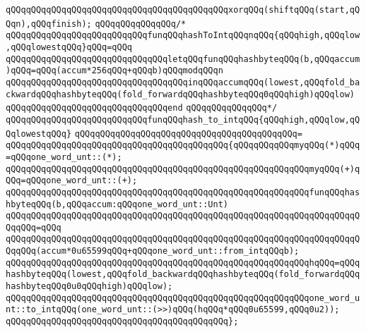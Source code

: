 \verb|qQQqqQQqqQQqqQQqqQQqqQQqqQQqqQQqqQQqqQQqqQQqxorqQQq(shiftqQQq(start,qQQqn),qQQqfinish);|\newline
\newline
\newline
\verb|qQQqqQQqqQQqqQQq/*|\newline
\verb|qQQqqQQqqQQqqQQqqQQqqQQqqQQqfunqQQqhashToIntqQQqnqQQq{qQQqhigh,qQQqlow,qQQqlowestqQQq}qQQq=qQQq|\newline
\verb|qQQqqQQqqQQqqQQqqQQqqQQqqQQqqQQqletqQQqfunqQQqhashbyteqQQq(b,qQQqaccum)qQQq=qQQq(accum*256qQQq+qQQqb)qQQqmodqQQqn|\newline
\verb|qQQqqQQqqQQqqQQqqQQqqQQqqQQqqQQqqQQqinqQQqaccumqQQq(lowest,qQQqfold_backwardqQQqhashbyteqQQq(fold_forwardqQQqhashbyteqQQq0qQQqhigh)qQQqlow)|\newline
\verb|qQQqqQQqqQQqqQQqqQQqqQQqqQQqqQQqend|\newline
\verb|qQQqqQQqqQQqqQQq*/|\newline
\verb|qQQqqQQqqQQqqQQqqQQqqQQqqQQqfunqQQqhash_to_intqQQq{qQQqhigh,qQQqlow,qQQqlowestqQQq}|\newline
\verb|qQQqqQQqqQQqqQQqqQQqqQQqqQQqqQQqqQQqqQQqqQQq=|\newline
\verb|qQQqqQQqqQQqqQQqqQQqqQQqqQQqqQQqqQQqqQQqqQQq{qQQqqQQqqQQqmyqQQq(*)qQQq=qQQqone_word_unt::(*);|\newline
\verb|qQQqqQQqqQQqqQQqqQQqqQQqqQQqqQQqqQQqqQQqqQQqqQQqqQQqqQQqqQQqmyqQQq(+)qQQq=qQQqone_word_unt::(+);|\newline
\newline
\verb|qQQqqQQqqQQqqQQqqQQqqQQqqQQqqQQqqQQqqQQqqQQqqQQqqQQqqQQqqQQqfunqQQqhashbyteqQQq(b,qQQqaccum:qQQqone_word_unt::Unt)|\newline
\verb|qQQqqQQqqQQqqQQqqQQqqQQqqQQqqQQqqQQqqQQqqQQqqQQqqQQqqQQqqQQqqQQqqQQqqQQqqQQq=qQQq|\newline
\verb|qQQqqQQqqQQqqQQqqQQqqQQqqQQqqQQqqQQqqQQqqQQqqQQqqQQqqQQqqQQqqQQqqQQqqQQqqQQq(accum*0u65599qQQq+qQQqone_word_unt::from_intqQQqb);|\newline
\newline
\verb|qQQqqQQqqQQqqQQqqQQqqQQqqQQqqQQqqQQqqQQqqQQqqQQqqQQqqQQqqQQqhqQQq=qQQqhashbyteqQQq(lowest,qQQqfold_backwardqQQqhashbyteqQQq(fold_forwardqQQqhashbyteqQQq0u0qQQqhigh)qQQqlow);|\newline
\newline
\verb|qQQqqQQqqQQqqQQqqQQqqQQqqQQqqQQqqQQqqQQqqQQqqQQqqQQqqQQqqQQqone_word_unt::to_intqQQq(one_word_unt::(>>)qQQq(hqQQq*qQQq0u65599,qQQq0u2));|\newline
\verb|qQQqqQQqqQQqqQQqqQQqqQQqqQQqqQQqqQQqqQQqqQQq};|\newline
